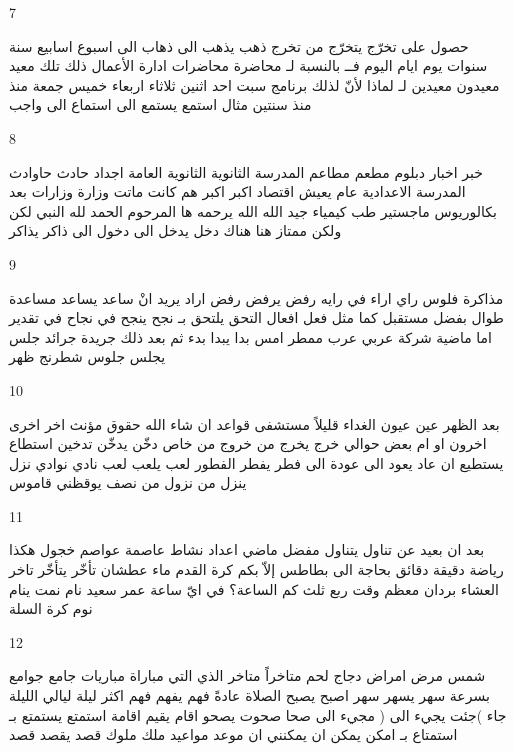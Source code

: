 \documentclass[twocolumn,a4paper]{article}
\newcommand{\prth}[1]{\textenglish{)}#1\textenglish{(}}
\begin{document}
7

\textarabic{ حصول على  
 تخرّج  يتخرّج من   
 تخرج  
 ذهب  يذهب الى  
 ذهاب الى  
 اسبوع  اسابيع  
 سنة  سنوات  
 يوم  ايام  
 اليوم  
 فــ  
 بالنسبة لـ  
 محاضرة  محاضرات
 ادارة اﻷعمال  
 ذلك  تلك  
 معيد  معيدون
  معيدين
  لـ  
 لماذا  
 ﻷنّ  
 لذلك  
 برنامج  
 سبت  
 احد  
 اثنين  
 ثلاثاء  
 اربعاء  
 خميس  
 جمعة  
 منذ  
 منذ سنتين  
 مثال  
 استمع  يستمع الى   
 استماع الى   
 واجب  
}

8

\textarabic{ خبر  اخبار  
 دبلوم  
 مطعم  مطاعم  
 المدرسة الثانوية  
 الثانوية العامة  
 اجداد  
 حادث  حاوادث  
 المدرسة الاعدادية  
 عام  
 يعيش  
 اقتصاد  
 اكبر  
 اكبر هم  
 كانت  
 ماتت  
 وزارة  وزارات
 بعد  
 بكالوريوس  
 ماجستير  
 طب  
 كيمياء  
 جيد  
 الله  
 الله يرحمه  ها  
 المرحوم  
 الحمد لله  
 النبي  
 لكن  ولكن  
 ممتاز  
 هنا  
 هناك  
 دخل  يدخل الى   
 دخول الى  
 ذاكر  يذاكر   
}

9

\textarabic{ مذاكرة  
 فلوس  
 راي  اراء  
 في رايه  
 رفض  يرفض   
 رفض  
 اراد  يريد انْ   
 ساعد  يساعد   
 مساعدة  
 طوال  
 بفضل  
 مستقبل  
 كما  
 مثل  
 فعل  افعال  
 التحق  يلتحق بـ  
 نجح  ينجح في  
 نجاح في  
 تقدير  
 اما  
 ماضية  
 شركة  
 عربي  عرب  
 ممطر  
 امس  
 بدا  يبدا   
 بدء  
 ثم  
 بعد ذلك  
 جريدة  جرائد  
 جلس  يجلس   
 جلوس  
 شطرنج  
 ظهر  
}

10

\textarabic{ بعد الظهر  
 عين  عيون  
 الغداء  
 قليلاً  
 مستشفى  
 قواعد  
 ان شاء الله  
 حقوق  
 مؤنث  
 اخر  اخرى   
 اخرون  
 او  
 ام  
 بعض  
 حوالي  
 خرج  يخرج من   
 خروج من  
 خاص  
 دخّن  يدخّن   
 تدخين  
 استطاع  يستطيع ان   
 عاد  يعود الى   
 عودة الى  
 فطر  يفطر  
 الفطور  
 لعب  يلعب   
 لعب  
 نادي  نوادي  
 نزل  ينزل من   
 نزول من  
 نصف  
 يوقظني  
 قاموس  
}

11

\textarabic{ بعد ان  
 بعيد عن  
 تناول  يتناول   
 مفضل  
 ماضي  
 اعداد  
 نشاط   
 عاصمة  عواصم  
 خجول  
 هكذا  
 رياضة  
 دقيقة  دقائق  
 بحاجة الى  
 بطاطس  
 إلاّ  
 بكم  
 كرة القدم  
 ماء  
 عطشان  
 تأخّر  يتأخّر   
 تاخر  
 العشاء  
 بردان  
 معظم  
 وقت  
 ربع  
 ثلث  
 كم الساعة؟  
 في ايّ ساعة  
 عمر  
 سعيد  
 نام  نمت  ينام   
 نوم  
 كرة السلة  
}

12

\textarabic{ شمس  
 مرض  امراض  
 دجاج  
 لحم  
 متاخراً  
 متاخر  
 الذي  التي  
 مباراة  مباريات  
 جامع  جوامع  
 بسرعة  
 سهر  يسهر   
 سهر  
 اصبح  يصبح  
 الصلاة  
 عادةً  
 فهم  يفهم   
 فهم  
 اكثر  
 ليلة  ليالي  
 الليلة  
 جاء \prth{جئت يجيء الى }  
 مجيء الى  
 صحا  صحوت  يصحو   
 اقام  يقيم   
 اقامة  
 استمتع  يستمتع بـ   استمتاع بـ   
 امكن  يمكن ان  
 يمكنني ان  
 موعد  مواعيد  
 ملك  ملوك  
 قصد  يقصد   
 قصد  
}
\end{document}
